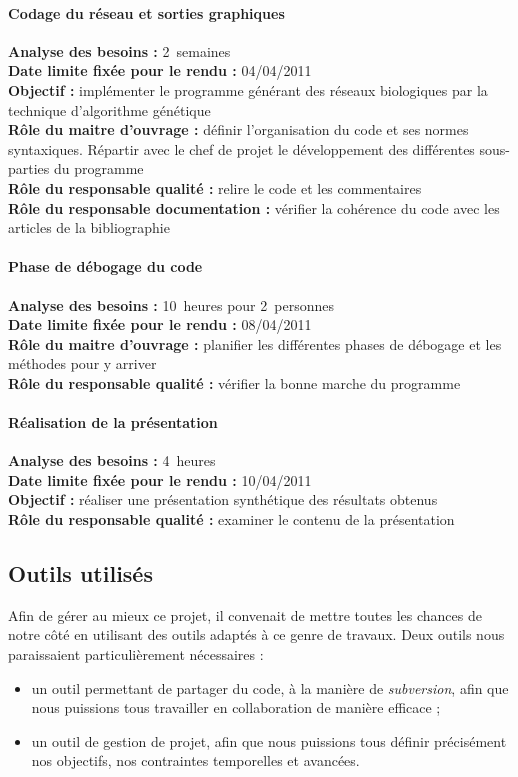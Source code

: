 \paragraph*{Codage du réseau et sorties graphiques\\}
\textbf{Analyse des besoins : }2~semaines\\
\textbf{Date limite fixée pour le rendu : }04/04/2011\\
\textbf{Objectif : }implémenter le programme générant des réseaux biologiques par la technique d'algorithme génétique\\
\textbf{Rôle du maitre d'ouvrage : }définir l'organisation du code et ses normes syntaxiques. Répartir avec le chef de projet le développement des différentes sous-parties du programme\\
\textbf{Rôle du responsable qualité : }relire le code et les commentaires\\
\textbf{Rôle du responsable documentation : }vérifier la cohérence du code avec les articles de la bibliographie

\paragraph*{Phase de débogage du code\\}
\textbf{Analyse des besoins :} 10~heures pour 2~personnes\\
\textbf{Date limite fixée pour le rendu :} 08/04/2011\\
\textbf{Rôle du maitre d'ouvrage :} planifier les différentes phases de débogage et les méthodes pour y arriver\\
\textbf{Rôle du responsable qualité :} vérifier la bonne marche du programme

\paragraph*{Réalisation de la présentation}
\textbf{Analyse des besoins : }4~heures\\
\textbf{Date limite fixée pour le rendu : }10/04/2011\\
\textbf{Objectif : }réaliser une présentation synthétique des résultats obtenus\\
\textbf{Rôle du responsable qualité : } examiner le contenu de la présentation


\subsection{Outils utilisés}
Afin de gérer au mieux ce projet, il convenait de mettre toutes les chances de notre côté en utilisant des outils adaptés à ce genre de travaux. Deux outils nous paraissaient particulièrement nécessaires :
\begin{itemize}
  \item un outil permettant de partager du code, à la manière de \textit{subversion}, afin que nous puissions tous travailler en collaboration de manière efficace ;
  \item un outil de gestion de projet, afin que nous puissions tous définir précisément nos objectifs, nos contraintes temporelles et avancées.
\end{itemize}

